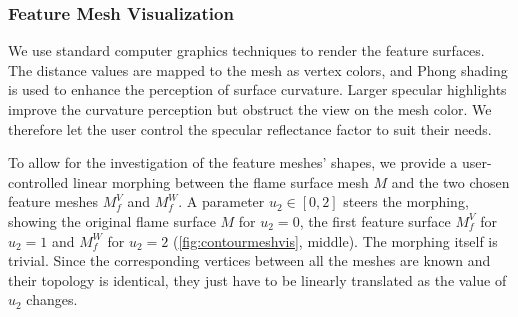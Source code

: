 \subsubsection{Feature Mesh Visualization}
%
We use standard computer graphics techniques to render the feature surfaces.
%
The distance values are mapped to the mesh as vertex colors, and Phong shading
is used to enhance the perception of surface curvature.
%
Larger specular highlights improve the curvature perception but obstruct the
view on the mesh color. We therefore let the user control the specular
reflectance factor to suit their needs.
%

%
To allow for the investigation of the feature meshes' shapes, we provide a
user-controlled linear morphing between the flame surface mesh $M$ and the two
chosen feature meshes $M^{V}_{f}$ and $M^{W}_{f}$.
%
A parameter $u_2 \in [0, 2]$ steers the morphing, showing the original flame
surface $M$ for $u_2 = \num{0}$, the first feature surface $M^{V}_{f}$ for $u_2
= \num{1}$ and $M^{W}_{f}$ for $u_2 = \num{2}$ (\cref{fig:contourmeshvis},
middle).
%
The morphing itself is trivial.
%
Since the corresponding vertices between all the meshes are known
and their topology is identical, they just have to be linearly translated as the
value of $u_2$ changes.
%

